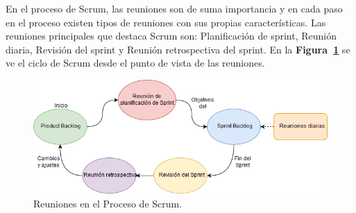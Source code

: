 En el proceso de Scrum, las reuniones son de suma importancia y en cada paso en el proceso existen tipos de reuniones con sus propias características. Las reuniones principales que destaca Scrum son: Planificación de sprint, Reunión diaria, Revisión del sprint y Reunión retrospectiva del sprint. En la \textbf{Figura~\ref{fig: reunionesScrum}} se ve el ciclo de Scrum desde el punto de vista de las reuniones.

\begin{figure}[ht!]
    \includegraphics[width=\textwidth]{Imagenes/Reuniones_Scrum.jpg}
    \caption{\label{fig: reunionesScrum} Reuniones en el Proceso de Scrum.}
\end{figure}

